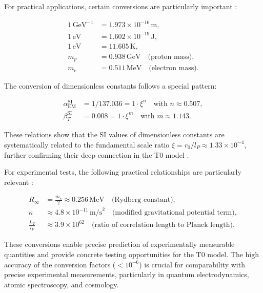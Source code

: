 \documentclass[twocolumn,aps,prl]{revtex4-2}
\begin{document}
	For practical applications, certain conversions are particularly important \cite{pascher_alpha_2025}:
	
	\begin{align}
		1 \, \text{GeV}^{-1} &= 1.973 \times 10^{-16} \, \text{m}, \\
		1 \, \text{eV} &= 1.602 \times 10^{-19} \, \text{J}, \\
		1 \, \text{eV} &= 11.605 \, \text{K}, \\
		m_p &= 0.938 \, \text{GeV} \quad \text{(proton mass)}, \\
		m_e &= 0.511 \, \text{MeV} \quad \text{(electron mass)}.
	\end{align}
	
	The conversion of dimensionless constants follows a special pattern:
	
	\begin{align}
		\alpha_{\text{EM}}^{\text{SI}} &= 1/137.036 = 1 \cdot \xi^n \quad \text{with } n \approx 0.507, \\
		\beta_T^{\text{SI}} &= 0.008 = 1 \cdot \xi^m \quad \text{with } m \approx 1.143.
	\end{align}
	
	These relations show that the SI values of dimensionless constants are systematically related to the fundamental scale ratio $\xi = r_0/l_P \approx 1.33 \times 10^{-4}$, further confirming their deep connection in the T0 model \cite{pascher_beta_2025}.
	
	For experimental tests, the following practical relationships are particularly relevant \cite{pascher_alpha_2025}:
	
	\begin{align}
		R_{\infty} &= \frac{m_e}{2} \approx 0.256 \, \text{MeV} \quad \text{(Rydberg constant)}, \\
		\kappa &\approx 4.8 \times 10^{-11} \, \text{m/s}^2 \quad \text{(modified gravitational potential term)}, \\
		\frac{L_T}{l_P} &\approx 3.9 \times 10^{62} \quad \text{(ratio of correlation length to Planck length)}.
	\end{align}
	
	These conversions enable precise prediction of experimentally measurable quantities and provide concrete testing opportunities for the T0 model. The high accuracy of the conversion factors ($<10^{-6}$) is crucial for comparability with precise experimental measurements, particularly in quantum electrodynamics, atomic spectroscopy, and cosmology.
	
\end{document}
